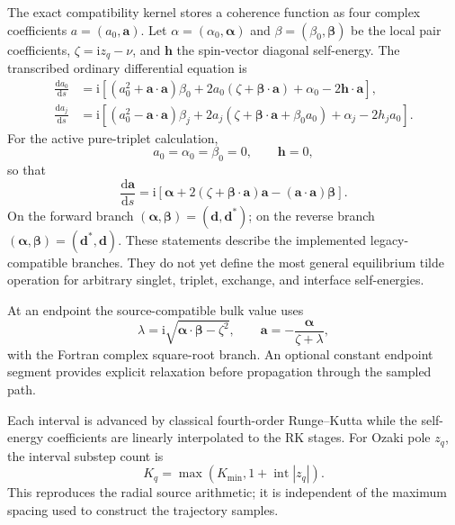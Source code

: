 \documentclass[11pt,a4paper]{article}
\newcommand{\ii}{\mathrm{i}}
\newcommand{\dd}{\mathrm{d}}
\begin{document}
The exact compatibility kernel stores a coherence function as four complex
coefficients $a=(a_0,\bm a)$.  Let
$\alpha=(\alpha_0,\bm\alpha)$ and
$\beta=(\beta_0,\bm\beta)$ be the local pair coefficients,
$\zeta=\ii z_q-\nu$, and $\bm h$ the spin-vector diagonal self-energy.  The
transcribed ordinary differential equation is
\begin{align}
 \frac{\dd a_0}{\dd s}
 &=\ii\left[(a_0^2+\bm a\cdot\bm a)\beta_0
   +2a_0(\zeta+\bm\beta\cdot\bm a)
   +\alpha_0-2\bm h\cdot\bm a\right],
   \label{eq:riccati0}\\
 \frac{\dd a_j}{\dd s}
 &=\ii\left[(a_0^2-\bm a\cdot\bm a)\beta_j
   +2a_j(\zeta+\bm\beta\cdot\bm a+\beta_0a_0)
   +\alpha_j-2h_ja_0\right].
   \label{eq:riccatij}
\end{align}
For the active pure-triplet calculation,
\begin{equation}
  a_0=\alpha_0=\beta_0=0,\qquad \bm h=0,
\end{equation}
so that
\begin{equation}
  \frac{\dd\bm a}{\dd s}
  =\ii\left[\bm\alpha
       +2(\zeta+\bm\beta\cdot\bm a)\bm a
       -(\bm a\cdot\bm a)\bm\beta\right].
  \label{eq:riccati-triplet}
\end{equation}
On the forward branch $(\bm\alpha,\bm\beta)=(\bm d,\bm d^*)$; on the reverse
branch $(\bm\alpha,\bm\beta)=(\bm d^*,\bm d)$.  These statements describe the
implemented legacy-compatible branches.  They do not yet define the most
general equilibrium tilde operation for arbitrary singlet, triplet, exchange,
and interface self-energies.

At an endpoint the source-compatible bulk value uses
\begin{equation}
  \lambda=\ii\sqrt{\bm\alpha\cdot\bm\beta-\zeta^2},
  \qquad
  \bm a=-\frac{\bm\alpha}{\zeta+\lambda},
  \label{eq:bulkcoherence}
\end{equation}
with the Fortran complex square-root branch.  An optional constant endpoint
segment provides explicit relaxation before propagation through the sampled
path.

Each interval is advanced by classical fourth-order Runge--Kutta while the
self-energy coefficients are linearly interpolated to the RK stages.  For
Ozaki pole $z_q$, the interval substep count is
\begin{equation}
  K_q=\max\!\left(K_{\min},1+\operatorname{int}|z_q|\right).
  \label{eq:substeps}
\end{equation}
This reproduces the radial source arithmetic; it is independent of the maximum
spacing used to construct the trajectory samples.
\end{document}
